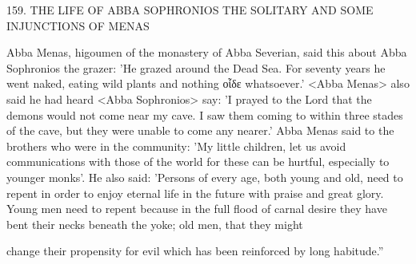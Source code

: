 159. THE LIFE OF ABBA SOPHRONIOS
THE SOLITARY AND SOME INJUNCTIONS OF MENAS

Abba Menas, higoumen of the monastery of Abba Severian, said
this about Abba Sophronios the grazer: 'He grazed around the
Dead Sea. For seventy years he went naked, eating wild plants and
nothing οἶδε whatsoever.' <Abba Menas> also said he had heard
<Abba Sophronios> say: 'I prayed to the Lord that the demons
would not come near my cave. I saw them coming to within three
stades of the cave, but they were unable to come any nearer.' Abba
Menas said to the brothers who were in the community: 'My little
children, let us avoid communications with those of the world for
these can be hurtful, especially to younger monks'. He also said:
'Persons of every age, both young and old, need to repent in order
to enjoy eternal life in the future with praise and great glory. Young
men need to repent because in the full flood of carnal desire they
have bent their necks beneath the yoke; old men, that they might

change their propensity for evil which has been reinforced by long
habitude.”

